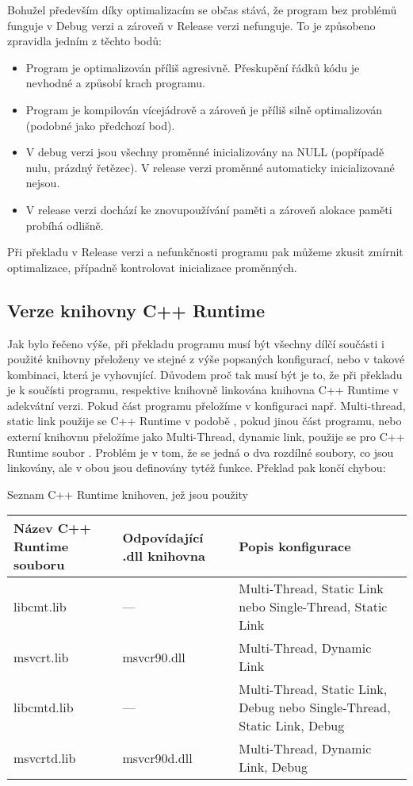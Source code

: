 Bohužel především díky optimalizacím se občas stává, že program bez problémů funguje v Debug verzi a zároveň v Release verzi nefunguje. To je způsobeno zpravidla jedním z těchto bodů:

\begin{itemize}
	\item Program je optimalizován příliš agresivně. Přeskupění řádků kódu je nevhodné a způsobí krach programu.
	\item Program je kompilován vícejádrově a zároveň je příliš silně optimalizován (podobné jako předchozí bod).
	\item V debug verzi jsou všechny proměnné inicializovány na NULL (popřípadě nulu, prázdný řetězec). V release verzi proměnné automaticky inicializované nejsou.
	\item V release verzi dochází ke znovupoužívání paměti a zároveň alokace paměti probíhá odlišně.
\end{itemize}

Při překladu v Release verzi a nefunkčnosti programu pak můžeme zkusit zmírnit optimalizace, případně kontrolovat inicializace proměnných.

\subsection{Verze knihovny C++ Runtime}
Jak bylo řečeno výše, při překladu programu musí být všechny dílčí součásti i použité knihovny přeloženy ve stejné z výše popsaných konfigurací, nebo v takové kombinaci, která je vyhovující. Důvodem proč tak musí být je to, že při překladu je k součísti programu, respektive knihovně linkována knihovna C++ Runtime v adekvátní verzi. Pokud část programu přeložíme v konfiguraci např. Multi-thread, static link použije se C++ Runtime v podobě , pokud jinou část programu, nebo externí knihovnu přeložíme jako Multi-Thread, dynamic link, použije se pro C++ Runtime soubor . Problém je v tom, že se jedná o dva rozdílné soubory, co jsou linkovány, ale v obou jsou definovány tytéž funkce. Překlad pak končí chybou:


Seznam C++ Runtime knihoven, jež jsou použity 

\hspace{-0.5cm}
\begin{tabular}{| p{3cm} | p{3cm} | p{7.5cm} | }
  \hline                       
  Název C++ Runtime souboru & Odpovídající .dll knihovna & Popis konfigurace\\
  \hline
  \hline                     
  libcmt.lib & ---  & Multi-Thread, Static Link nebo Single-Thread, Static Link\\
  \hline
  msvcrt.lib & msvcr90.dll  & Multi-Thread, Dynamic Link\\
  \hline
  libcmtd.lib & ---  & Multi-Thread, Static Link, Debug nebo Single-Thread, Static Link, Debug\\
  \hline
  msvcrtd.lib & msvcr90d.dll & Multi-Thread, Dynamic Link, Debug\\
  \hline
\end{tabular}

